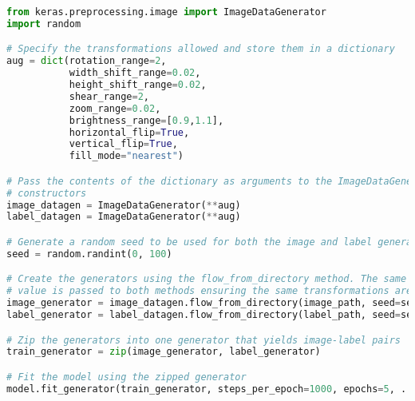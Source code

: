 \begin{lstlisting}[float={t},caption={A simplified example of online augmentation implemented using the \texttt{ImageDataGenerator} class. The model is then trained for five epochs with each epoch consisting of 1000 training samples.},label={lst:augment},language=Python,upquote=true]
from keras.preprocessing.image import ImageDataGenerator
import random

# Specify the transformations allowed and store them in a dictionary
aug = dict(rotation_range=2,
           width_shift_range=0.02,
           height_shift_range=0.02,
           shear_range=2,
           zoom_range=0.02,
           brightness_range=[0.9,1.1],
           horizontal_flip=True,
           vertical_flip=True,
           fill_mode="nearest")

# Pass the contents of the dictionary as arguments to the ImageDataGenerator
# constructors
image_datagen = ImageDataGenerator(**aug)
label_datagen = ImageDataGenerator(**aug)

# Generate a random seed to be used for both the image and label generators
seed = random.randint(0, 100)

# Create the generators using the flow_from_directory method. The same seed
# value is passed to both methods ensuring the same transformations are applied.
image_generator = image_datagen.flow_from_directory(image_path, seed=seed, ...)
label_generator = label_datagen.flow_from_directory(label_path, seed=seed, ...)

# Zip the generators into one generator that yields image-label pairs
train_generator = zip(image_generator, label_generator)

# Fit the model using the zipped generator
model.fit_generator(train_generator, steps_per_epoch=1000, epochs=5, ...)
\end{lstlisting}